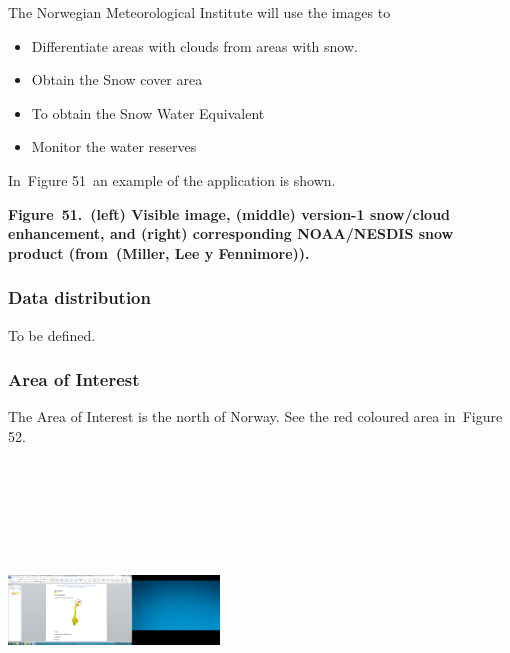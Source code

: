 \documentclass[a4paper]{article}
\newcommand\liststyleLFOix{%
\renewcommand\labelitemi{[F0B7?]}
\renewcommand\labelitemii{o}
\renewcommand\labelitemiii{[F0A7?]}
\renewcommand\labelitemiv{[F0B7?]}
}
\begin{document}
\bigskip

{
The Norwegian Meteorological Institute will use the images to\ }

\liststyleLFOix
\begin{itemize}
\item {
Differentiate areas with clouds from areas with snow.}
\item {
Obtain the Snow cover area}
\item {
To obtain the Snow Water Equivalent}
\item {
Monitor the water reserves}
\end{itemize}

\bigskip

\foreignlanguage{english}{In\ }Figure 51\foreignlanguage{english}{\ an
example of the application is shown.\ }


\bigskip

{%
 \par}

{\centering\bfseries
\label{bkm:Ref377556182}Figure\ 51.\ (left) Visible image, (middle)
version-1 snow/cloud enhancement, and (right) corresponding NOAA/NESDIS
snow product (from\ (Miller, Lee y Fennimore)).
\par}


\bigskip

\subsubsection[Data distribution]{ Data
distribution}
\hypertarget{Toc381777285}{}{
To be defined.}

\subsubsection[Area of Interest\ ]{ Area of
Interest\ }
\hypertarget{Toc381777286}{}\foreignlanguage{english}{The Area of
Interest is the north of Norway. See the red coloured area in\ }Figure
52\foreignlanguage{english}{.}


\bigskip

{\centering 
\includegraphics[width=2.20866in,height=3.11221in]{out-img59.png} \par}
\end{document}
